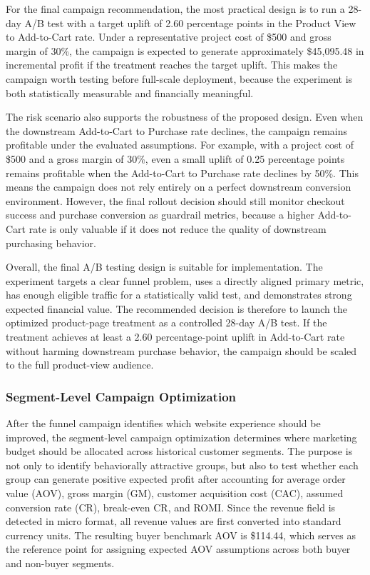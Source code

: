 \documentclass[conference]{IEEEtran}
\begin{document}
For the final campaign recommendation, the most practical design is to run a 28-day A/B test with a target uplift of 2.60 percentage points in the Product View to Add-to-Cart rate. Under a representative project cost of \$500 and gross margin of 30\%, the campaign is expected to generate approximately \$45,095.48 in incremental profit if the treatment reaches the target uplift. This makes the campaign worth testing before full-scale deployment, because the experiment is both statistically measurable and financially meaningful.

The risk scenario also supports the robustness of the proposed design. Even when the downstream Add-to-Cart to Purchase rate declines, the campaign remains profitable under the evaluated assumptions. For example, with a project cost of \$500 and a gross margin of 30\%, even a small uplift of 0.25 percentage points remains profitable when the Add-to-Cart to Purchase rate declines by 50\%. This means the campaign does not rely entirely on a perfect downstream conversion environment. However, the final rollout decision should still monitor checkout success and purchase conversion as guardrail metrics, because a higher Add-to-Cart rate is only valuable if it does not reduce the quality of downstream purchasing behavior.

Overall, the final A/B testing design is suitable for implementation. The experiment targets a clear funnel problem, uses a directly aligned primary metric, has enough eligible traffic for a statistically valid test, and demonstrates strong expected financial value. The recommended decision is therefore to launch the optimized product-page treatment as a controlled 28-day A/B test. If the treatment achieves at least a 2.60 percentage-point uplift in Add-to-Cart rate without harming downstream purchase behavior, the campaign should be scaled to the full product-view audience.


\subsubsection{Segment-Level Campaign Optimization}

After the funnel campaign identifies which website experience should be improved, the segment-level campaign optimization determines where marketing budget should be allocated across historical customer segments. The purpose is not only to identify behaviorally attractive groups, but also to test whether each group can generate positive expected profit after accounting for average order value (AOV), gross margin (GM), customer acquisition cost (CAC), assumed conversion rate (CR), break-even CR, and ROMI. Since the revenue field is detected in micro format, all revenue values are first converted into standard currency units. The resulting buyer benchmark AOV is \$114.44, which serves as the reference point for assigning expected AOV assumptions across both buyer and non-buyer segments.
\end{document}
